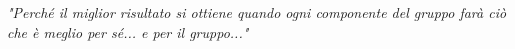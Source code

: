 \begin{titlepage}

\nonumber
\null {}
	\begin{flushright}
\textit{"Perché il miglior risultato si ottiene quando ogni componente del gruppo farà ciò che è meglio per sé... e per il gruppo..."} \\[5mm]
	\end{flushright}



\end{titlepage}